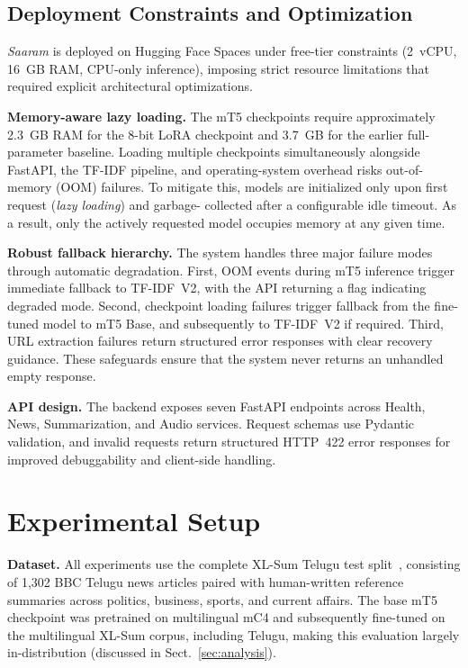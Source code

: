 \documentclass[runningheads]{llncs}
\begin{document}
\subsection{Deployment Constraints and Optimization}
\label{sec:deployment}

\textit{Saaram} is deployed on Hugging Face Spaces under
free-tier constraints (2~vCPU, 16~GB RAM, CPU-only
inference), imposing strict resource limitations that
required explicit architectural optimizations.

\textbf{Memory-aware lazy loading.}
The mT5 checkpoints require approximately 2.3~GB RAM for
the 8-bit LoRA checkpoint and 3.7~GB for the earlier
full-parameter baseline. Loading multiple checkpoints
simultaneously alongside FastAPI, the TF-IDF pipeline,
and operating-system overhead risks out-of-memory (OOM)
failures. To mitigate this, models are initialized only
upon first request (\emph{lazy loading}) and garbage-
collected after a configurable idle timeout. As a result,
only the actively requested model occupies memory at any
given time.

\textbf{Robust fallback hierarchy.}
The system handles three major failure modes through
automatic degradation. First, OOM events during mT5
inference trigger immediate fallback to TF-IDF~V2, with
the API returning a flag indicating degraded mode.
Second, checkpoint loading failures trigger fallback from
the fine-tuned model to mT5 Base, and subsequently to
TF-IDF~V2 if required. Third, URL extraction failures
return structured error responses with clear recovery
guidance. These safeguards ensure that the system never
returns an unhandled empty response.

\textbf{API design.}
The backend exposes seven FastAPI endpoints across Health,
News, Summarization, and Audio services. Request schemas
use Pydantic validation, and invalid requests return
structured HTTP~422 error responses for improved
debuggability and client-side handling.

\section{Experimental Setup}
\label{sec:setup}

\textbf{Dataset.}
All experiments use the complete XL-Sum Telugu test
split~\cite{hasan2021xlsum}, consisting of 1,302 BBC
Telugu news articles paired with human-written reference
summaries across politics, business, sports, and current
affairs. The base mT5 checkpoint was pretrained on
multilingual mC4 and subsequently fine-tuned on the
multilingual XL-Sum corpus, including Telugu, making
this evaluation largely in-distribution (discussed in
Sect.~\ref{sec:analysis}).
\end{document}

